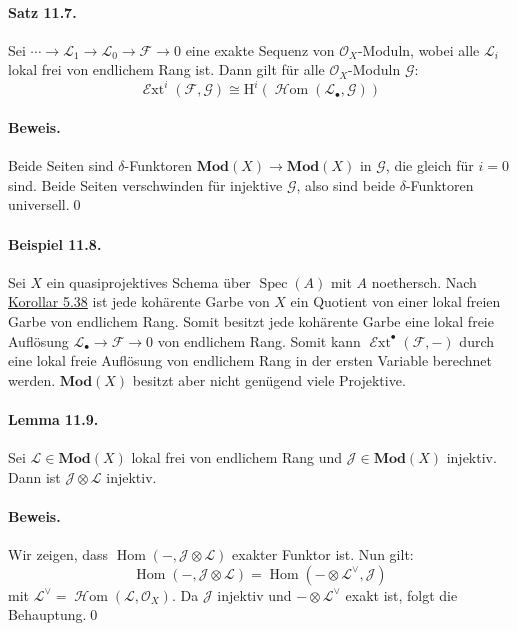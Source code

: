 \paragraph{Satz 11.7.}\label{11.7} Sei $\cdots\to\mathcal{L}_1\to\mathcal{L}_0\to\mathcal{F}\to 0$ eine exakte Sequenz von $\mathcal{O}_X$-Moduln, wobei alle $\mathcal{L}_i$ lokal frei von endlichem Rang ist. Dann gilt für alle $\mathcal{O}_X$-Moduln $\mathcal{G}$:
\[\operatorname{\mathcal{E}xt}^i(\mathcal{F},\mathcal{G})\cong \mathrm{H}^i(\operatorname{\mathcal{H}om}(\mathcal{L}_\bullet,\mathcal{G})) \]

\paragraph{Beweis.} Beide Seiten sind $\delta$-Funktoren $\mathbf{Mod}(X)\to\mathbf{Mod}(X)$ in $\mathcal{G}$, die gleich für $i=0$ sind. Beide Seiten verschwinden für injektive $\mathcal{G}$, also sind beide $\delta$-Funktoren universell.\qed

\paragraph{Beispiel 11.8.}\label{11.8} Sei $X$ ein quasiprojektives Schema über $\operatorname{Spec}(A)$ mit $A$ noethersch. Nach \hyperref[5.38]{Korollar 5.38} ist jede kohärente Garbe von $X$ ein Quotient von einer lokal freien Garbe von endlichem Rang. Somit besitzt jede kohärente Garbe eine lokal freie Auflösung $\mathcal{L}_\bullet\to\mathcal{F}\to 0$ von endlichem Rang. Somit kann $\operatorname{\mathcal{E}xt}^\bullet(\mathcal{F},-)$ durch eine lokal freie Auflösung von endlichem Rang in der ersten Variable berechnet werden. $\mathbf{Mod}(X)$ besitzt aber nicht genügend viele Projektive.

\paragraph{Lemma 11.9.}\label{11.9} Sei $\mathcal{L}\in\mathbf{Mod}(X)$ lokal frei von endlichem Rang und $\mathcal{J}\in\mathbf{Mod}(X)$ injektiv. Dann ist $\mathcal{J}\otimes\mathcal{L}$ injektiv.

\paragraph{Beweis.} Wir zeigen, dass $\operatorname{Hom}(-,\mathcal{J}\otimes\mathcal{L})$ exakter Funktor ist. Nun gilt:
\[\operatorname{Hom}(-,\mathcal{J}\otimes\mathcal{L})=\operatorname{Hom}(-\otimes\mathcal{L}^\vee,\mathcal{J})\]
mit $\mathcal{L}^\vee =\operatorname{\mathcal{H}om}(\mathcal{L},\mathcal{O}_X)$. Da $\mathcal{J}$ injektiv und $-\otimes\mathcal{L}^\vee$ exakt ist, folgt die Behauptung.\qed

